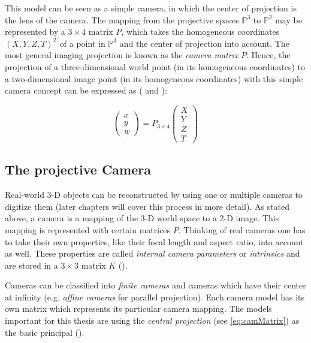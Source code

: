 This model can be seen as a simple camera, in which the center of projection is the lens of the camera. The mapping from the projective spaces $\mathbb{P}^3$ to $\mathbb{P}^2$ may be represented by a $3\times4$ matrix $P$, which takes the homogeneous coordinates $(X,Y,Z,T)^T$ of a point in $\mathbb{P}^3$ and the center of projection into account. The most general imaging projection is known as the \textit{camera matrix} $P$. Hence, the projection of a three-dimensional world point (in its homogeneous coordinates) to a two-dimensional image point (in its homogeneous coordinates) with this simple camera concept can be expressed as (\cite[p.7]{Hartley.2011} and \cite[p.42 et seqq.]{Szeliski.2011}):

\begin{equation} 
 \begin{pmatrix}
  x \\
  y \\
  w
 \end{pmatrix} = P_{3\times4}
 \begin{pmatrix}
  X \\
  Y \\
  Z \\
  T
 \end{pmatrix}\label{eq:camMatrix}
\end{equation}

\subsection{The projective Camera}\label{ssec:projCam}
Real-world 3-D objects can be reconstructed by using one or multiple cameras to digitize them (later chapters will cover this process in more detail). As stated above, a camera is a mapping of the 3-D world space to a 2-D image. This mapping is represented with certain matrices $P$. Thinking of real cameras one has to take their own properties, like their focal length and aspect ratio, into account as well. These properties are called \textit{internal camera parameters} or \textit{intrinsics} and are stored in a $3\times 3$ matrix $K$ (\cite[p.152 et seq.]{Hartley.2011}).

Cameras can be classified into \textit{finite cameras} and cameras which have their center at infinity (e.g. \textit{affine cameras} for parallel projection). Each camera model has its own matrix which represents its particular camera mapping. The models important for this thesis are using the \textit{central projection} (see \autoref{eq:camMatrix}) as the basic principal (\cite[p.153]{Hartley.2011}).

